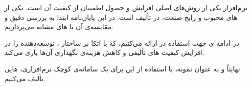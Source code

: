  نرم‌افزار یکی از روش‌های اصلی افزایش و حصول اطمینان از کیفیت آن است.  یکی از ‌های محبوب و رایج صنعت، در تألیف  است. در این پایان‌نامه ابتدا به بررسی دقیق  و مقایسه‌ی آن با ‌های مشابه می‌پردازیم.

در ادامه  ی جهت استفاده در   ارائه می‌کنیم، که با اتکا بر  ساختار ، توسعه‌دهنده را در افزایش کیفیت ‌های تألیفی و کاهش هزینه‌ی نگهداری آن‌ها یاری می‌کند.

نهایتاً و به عنوان نمونه، با استفاده از این   برای یک سامانه‌ی کوچک نرم‌افزاری، ‌هایی تألیف می‌کنیم.
